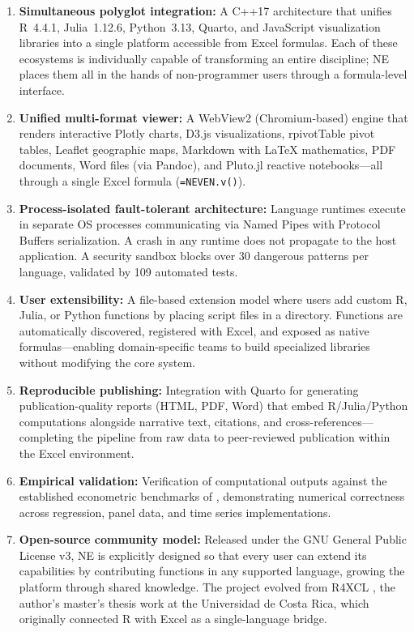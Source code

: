 \documentclass[preprint,12pt,authoryear]{elsarticle}
\newcommand{\neven}{NE\raisebox{0.2ex}{v}\rotatebox[origin=c]{180}{E}\rotatebox[origin=c]{180}{N}}
\begin{document}
\begin{enumerate}
    \item \textbf{Simultaneous polyglot integration:} A C++17 architecture that unifies R~4.4.1, Julia~1.12.6, Python~3.13, Quarto, and JavaScript visualization libraries into a single platform accessible from Excel formulas. Each of these ecosystems is individually capable of transforming an entire discipline; \neven{} places them all in the hands of non-programmer users through a formula-level interface.

    \item \textbf{Unified multi-format viewer:} A WebView2 (Chromium-based) engine that renders interactive Plotly charts, D3.js visualizations, rpivotTable pivot tables, Leaflet geographic maps, Markdown with LaTeX mathematics, PDF documents, Word files (via Pandoc), and Pluto.jl reactive notebooks---all through a single Excel formula (\texttt{=NEVEN.v()}).

    \item \textbf{Process-isolated fault-tolerant architecture:} Language runtimes execute in separate OS processes communicating via Named Pipes with Protocol Buffers serialization. A crash in any runtime does not propagate to the host application. A security sandbox blocks over 30 dangerous patterns per language, validated by 109 automated tests.

    \item \textbf{User extensibility:} A file-based extension model where users add custom R, Julia, or Python functions by placing script files in a directory. Functions are automatically discovered, registered with Excel, and exposed as native formulas---enabling domain-specific teams to build specialized libraries without modifying the core system.

    \item \textbf{Reproducible publishing:} Integration with Quarto for generating publication-quality reports (HTML, PDF, Word) that embed R/Julia/Python computations alongside narrative text, citations, and cross-references---completing the pipeline from raw data to peer-reviewed publication within the Excel environment.

    \item \textbf{Empirical validation:} Verification of computational outputs against the established econometric benchmarks of \citet{Wooldridge2016}, demonstrating numerical correctness across regression, panel data, and time series implementations.

    \item \textbf{Open-source community model:} Released under the GNU General Public License v3, \neven{} is explicitly designed so that every user can extend its capabilities by contributing functions in any supported language, growing the platform through shared knowledge. The project evolved from R4XCL \citep{BonillaR4XCL2023}, the author's master's thesis work at the Universidad de Costa Rica, which originally connected R with Excel as a single-language bridge.
\end{enumerate}
\end{document}
